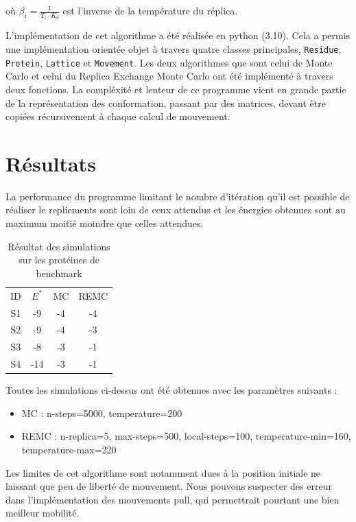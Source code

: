 où $\beta_i = \frac{1}{T_i \cdot K_b}$ est l'inverse de la température du réplica.

L'implémentation de cet algorithme a été réalisée en python (3.10). Cela a permis une implémentation orientée objet à travers quatre classes principales, \texttt{Residue}, \texttt{Protein}, \texttt{Lattice} et \texttt{Movement}. Les deux algorithmes que sont celui de Monte Carlo et celui du Replica Exchange Monte Carlo ont été implémenté à travers deux fonctions. La compléxité et lenteur de ce programme vient en grande partie de la représentation des conformation, passant par des matrices, devant être copiées récursivement à chaque calcul de mouvement.

\section{Résultats}

La performance du programme limitant le nombre d'itération qu'il est possible de réaliser le repliements sont loin de ceux attendus et les énergies obtenues sont au maximum moitié moindre que celles attendues.

\begin{table}[H]
    \centering
    \begin{tabular}{c|c|c|c}
        ID & $E^*$ & MC & REMC \\
        S1 & -9 & -4 & -4\\
        S2 & -9 & -4 & -3\\
        S3 & -8 & -3 & -1\\
        S4 & -14 & -3 & -1
    \end{tabular}
    \caption{Résultat des simulations sur les protéines de benchmark}
    \label{tab:my_label}
\end{table}

Toutes les simulations ci-dessus ont été obtenues avec les paramètres suivants :
\begin{itemize}
    \item MC : n-steps=5000, temperature=200
    \item REMC : n-replica=5, max-steps=500, local-steps=100, temperature-min=160, temperature-max=220
\end{itemize}

Les limites de cet algorithme sont notamment dues à la position initiale ne laissant que peu de liberté de mouvement. Nous pouvons suspecter des erreur dans l'implémentation des mouvements pull, qui permettrait pourtant une bien meilleur mobilité. 

